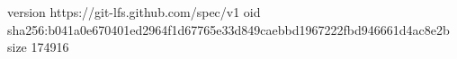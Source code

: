 version https://git-lfs.github.com/spec/v1
oid sha256:b041a0e670401ed2964f1d67765e33d849caebbd1967222fbd946661d4ac8e2b
size 174916
